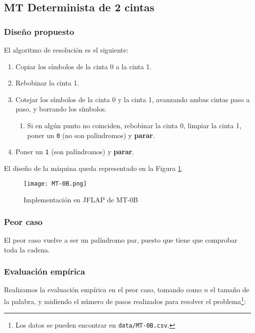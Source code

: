 
\subsection{MT Determinista de 2 cintas}

\subsubsection*{Diseño propuesto}
El algoritmo de resolución es el siguiente:

\begin{enumerate}
    \item Copiar los símbolos de la cinta 0 a la cinta 1.
    \item Rebobinar la cinta 1.
    \item Cotejar los símbolos de la cinta 0 y la cinta 1, avanzando ambas cintas paso a paso, y borrando los símbolos.
    \begin{enumerate}[1.]
        \item Si en algún punto no coinciden, rebobinar la cinta 0, limpiar la cinta 1, poner un \texttt{0} (no son palíndromos) y \textbf{parar}.
    \end{enumerate}
    \item Poner un \texttt{1} (son palíndromos) y \textbf{parar}.
\end{enumerate}

El diseño de la máquina queda representado en la Figura \ref{fig:MT-0B}.

\begin{figure}[h]
    \centering
    \texttt{[image: MT-0B.png]}
    \caption{Implementación en JFLAP de MT-0B}
    \label{fig:MT-0B}
\end{figure}

\subsubsection*{Peor caso}
El peor caso vuelve a ser un palíndromo par, puesto que tiene que comprobar toda la cadena.

\subsubsection*{Evaluación empírica}
Realizamos la evaluación empírica en el peor caso, tomando como $n$ el tamaño de la palabra, y midiendo el número de pasos realizados para resolver el problema\footnote{Los datos se pueden encontrar en \texttt{data/MT-0B.csv}.}:

